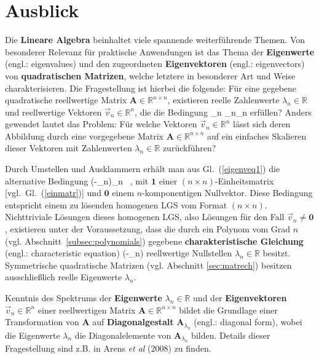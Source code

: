 \section[Ausblick]{Ausblick}
Die {\bf Lineare Algebra} beinhaltet viele spannende
weiterf\"uhrende Themen. Von besonderer Relevanz f\"ur praktische
Anwendungen ist das Thema der {\bf Eigenwerte} (engl.: 
eigenvalues) und den zugeordneten {\bf Eigenvektoren} (engl.: 
eigenvectors) von {\bf quadratischen Matrizen}, welche
letztere in besonderer Art und Weise charakterisieren. Die
Fragestellung ist hierbei die folgende: F\"ur eine gegebene
quadratische reellwertige Matrix $\mathbf{A}
\in \mathbb{R}^{n \times n}$,
existieren reelle Zahlenwerte $\lambda_{n} \in \mathbb{R}$ und
reellwertige Vektoren $\vec{v}_{n} \in \mathbb{R}^{n}$, die die
Bedingung
%
\be
{}
_{n} \stackrel{!}{=} \lambda_{n}_{n}
\ee
%
erf\"ullen? Anders gewendet lautet das Problem: F\"ur welche
Vektoren $\vec{v}_{n} \in \mathbb{R}^{n}$ l\"asst sich deren
Abbildung durch eine vorgegebene Matrix $\mathbf{A}
\in \mathbb{R}^{n \times n}$ auf ein einfaches Skalieren
dieser Vektoren mit Zahlenwerten $\lambda_{n} \in \mathbb{R}$
zur\"uckf\"uhren?

\medskip
\noindent
Durch Umstellen und Ausklammern erh\"alt man aus
Gl.~(\ref{eigenveq1}) die alternative Bedingung
%
\be
{}
 \stackrel{!}{=}
\left(-\lambda_{n}\right)_{n} \ ,
\ee
%
mit $\boldsymbol{1}$ einer $(n \times n)$-Einheitsmatrix
[vgl.\ Gl.~(\ref{einmatr})] und $\boldsymbol{0}$
einem $n$-komponentigen Nullvektor.
Diese Bedingung entspricht einem zu l\"osenden homogenen LGS
vom Format $(n \times n)$. Nichttriviale L\"osungen dieses
homogenen LGS, also L\"osungen f\"ur den Fall $\vec{v}_{n}
\neq \boldsymbol{0}$, existieren unter der Voraussetzung,
dass die durch ein Polynom vom Grad $n$ (vgl.
Abschnitt~\ref{subsec:polynomials}) gegebene
{\bf charakteristische Gleichung} (engl.: characteristic equation)
%
 \stackrel{!}{=} 
\det\left(-\lambda_{n}\right)
\ee
%
reellwertige Nullstellen $\lambda_{n} \in \mathbb{R}$ besitzt.
Symmetrische quadratische Matrizen (vgl. Abschnitt 
\ref{sec:matrech}) besitzen ausschlie\ss lich reelle Eigenwerte 
$\lambda_{n}$.

\medskip
\noindent
Kenntnis des Spektrums der {\bf Eigenwerte}
$\lambda_{n} \in \mathbb{R}$ und der {\bf Eigenvektoren}
$\vec{v}_{n} \in \mathbb{R}^{n}$ einer reellwertigen Matrix
$\mathbf{A} \in \mathbb{R}^{n \times n}$ bildet die Grundlage
einer Transformation von $\mathbf{A}$ auf {\bf Diagonalgestalt}
$\mathbf{A}_{\lambda_{n}}$ (engl.: diagonal form), wobei die 
Eigenwerte $\lambda_{n}$ die Diagonalelemente von 
$\mathbf{A}_{\lambda_{n}}$ bilden. Details dieser Fragestellung 
sind z.B. in Arens {\em et al\/} (2008)  
zu finden.

